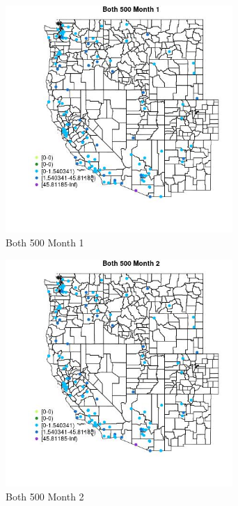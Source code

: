 \begin{figure} 
\centering  
\includegraphics[width=0.77\textwidth]{Code_Outputs/Report_ML_input_PM25_Step4_part_e_de_duplicated_aves_MapObsMo1Both_500.jpg} 
\caption{\label{fig:Report_ML_input_PM25_Step4_part_e_de_duplicated_avesMapObsMo1Both_500}Both 500 Month 1} 
\end{figure} 
 

\clearpage 

\begin{figure} 
\centering  
\includegraphics[width=0.77\textwidth]{Code_Outputs/Report_ML_input_PM25_Step4_part_e_de_duplicated_aves_MapObsMo2Both_500.jpg} 
\caption{\label{fig:Report_ML_input_PM25_Step4_part_e_de_duplicated_avesMapObsMo2Both_500}Both 500 Month 2} 
\end{figure} 
 

